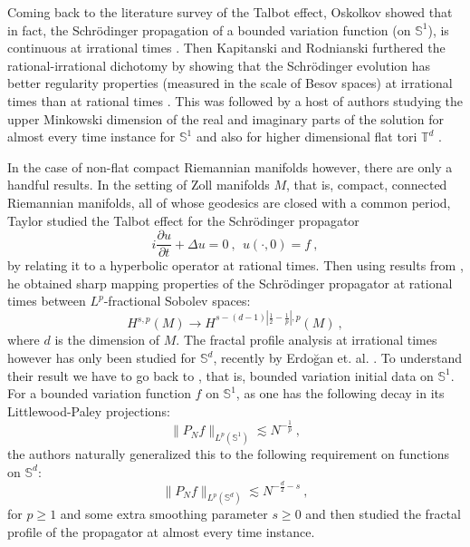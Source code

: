 \documentclass[12pt]{amsart}
\theoremstyle{definition}
\newcommand{\Sb}{\mathbb S}%
\newcommand{\T}{\mathbb T}%
\numberwithin{equation}{section}
\begin{document}
Coming back to the literature survey of the Talbot effect, Oskolkov showed that in fact, the Schr\"odinger propagation of a bounded variation function (on $\Sb^1$), is continuous at irrational times \cite{Oskolkov}. Then Kapitanski and Rodnianski furthered the rational-irrational dichotomy by showing that the Schr\"odinger evolution has better regularity properties (measured in the scale of Besov spaces) at irrational times than at rational times \cite{Kapitanski}. This was followed by a host of authors  studying the upper Minkowski dimension of the real and imaginary parts of the solution for almost every time instance for $\Sb^1$ \cite{Rodnianski, CO1, CO2, Chousionis} and also for higher dimensional flat tori $\T^d$ \cite{MathZ}. 

In the case of non-flat compact Riemannian manifolds however, there are only a handful results. In the setting of Zoll manifolds $M$, that is, compact, connected Riemannian manifolds, all of whose geodesics are closed with a common period, Taylor \cite{Taylor} studied the Talbot effect for the Schr\"odinger propagator
\begin{equation} \label{schrodinger}
i\frac{\partial u}{\partial t} +\Delta u=0\:,\:\:	u(\cdot, 0)=f\:, 
\end{equation}
by relating it to a hyperbolic operator at rational times. Then using results from \cite{SSS}, he obtained sharp mapping properties of the Schr\"odinger propagator at rational times between $L^p$-fractional Sobolev spaces: 
\begin{equation*} 
H^{s,p} (M) \to H^{s-(d-1)\left|\frac{1}{2}-\frac{1}{p}\right|,p}(M)\:,
\end{equation*}
where $d$ is the dimension of $M$. The fractal profile analysis at irrational times however has only been studied for $\Sb^d$, recently by Erdo\u{g}an et. al. \cite[Theorem 1.1]{MathZ}. To understand their result we have to go back to \cite{Oskolkov}, that is, bounded variation initial data on $\Sb^1$. For a bounded variation function $f$ on $\Sb^1$, as one has the following decay in its Littlewood-Paley projections:
\begin{equation} \label{Oskolkov_setting}
\|P_Nf\|_{L^p(\Sb^1)} \lesssim N^{-\frac{1}{p}}\:,
\end{equation}
the authors naturally generalized this to the following requirement on functions on $\Sb^d$:
\begin{equation*} 
\|P_Nf\|_{L^p(\Sb^d)} \lesssim N^{-\frac{d}{2}-s}\:,
\end{equation*}
for $p \ge 1$ and some extra smoothing parameter $s\ge 0$ and then studied the fractal profile of the propagator at almost every time instance.
\end{document}
